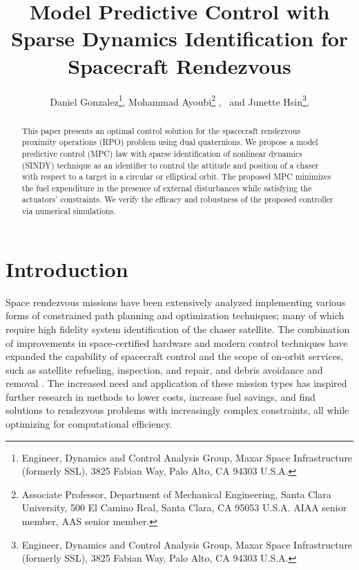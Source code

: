 \documentclass[letterpaper, preprint, paper,11pt]{AAS}	%
\begin{document}
\title{Model Predictive Control with Sparse Dynamics Identification for Spacecraft Rendezvous}

\author{Daniel Gonzalez\thanks{Engineer, Dynamics and Control Analysis Group, Maxar Space Infrastructure (formerly SSL), 3825 Fabian Way, Palo Alto, CA 94303 U.S.A.},
	 Mohammad Ayoubi\thanks{Associate Professor, Department of Mechanical Engineering, Santa Clara University, 500 El Camino Real,
	 	Santa Clara, CA 95053 U.S.A. AIAA senior member, AAS senior member.} , 
\ and Junette Hsin\thanks{Engineer, Dynamics and Control Analysis Group, Maxar Space Infrastructure (formerly SSL), 3825 Fabian Way, Palo Alto, CA 94303 U.S.A.}, 
}


\maketitle{} 		


\begin{abstract}
	
This paper presents an optimal control solution for the spacecraft rendezvous proximity operations (RPO) problem using dual quaternions. We propose a model predictive control (MPC) law with sparse identification of nonlinear dynamics (SINDY) technique as an identifier to control the attitude and position of a chaser with respect to a target in a circular or elliptical orbit. The proposed MPC minimizes the fuel expenditure in the presence of external disturbances while satisfying the actuators' constraints. We verify the efficacy and robustness of the proposed controller via numerical simulations.

\end{abstract}








\section{Introduction}
%

Space rendezvous missions have been extensively analyzed implementing various forms of constrained path planning and optimization techniques; many of which require high fidelity system identification of the chaser satellite. The combination of improvements in space-certified hardware and modern control techniques have expanded the capability of spacecraft control and the scope of on-orbit services, such as satellite refueling, inspection, and repair, and debris avoidance and removal \cite{ParkZagaris_AnalysisMPC,CairanoPark_MPCRPO}. The increased need and application of these mission types has inspired further research in methods to lower costs, increase fuel savings, and find solutions to rendezvous problems with increasingly complex constraints, all while optimizing for computational efficiency.
\end{document}
